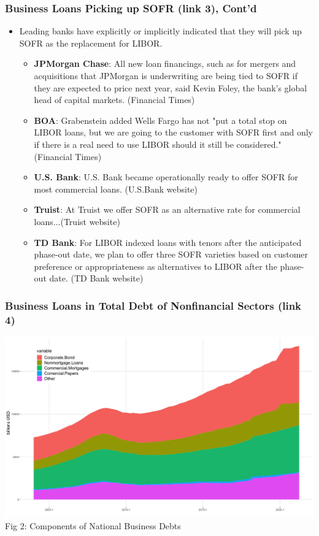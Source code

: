 \documentclass[10pt]{beamer}
\begin{document}
\begin{frame}
\frametitle{Business Loans Picking up SOFR (link 3),  Cont'd}
\begin{itemize}
\item Leading banks have explicitly or implicitly indicated that they will pick up SOFR as the replacement for LIBOR.
\begin{itemize}
\item \textbf{JPMorgan Chase}: All new loan financings, such as for mergers and acquisitions that JPMorgan is underwriting are being tied to SOFR if they are expected to price next year, said Kevin Foley, the bank's global head of capital markets. (Financial Times)
\item \textbf{BOA}: Grabenstein added Wells Fargo has not "put a total stop on LIBOR loans, but we are going to the customer with SOFR first and only if there is a real need to use LIBOR should it still be considered." (Financial Times)
\item \textbf{U.S.  Bank}: U.S. Bank became operationally ready to offer SOFR for most commercial loans.  (U.S.Bank website)
\item \textbf{Truist}: At Truist we offer SOFR as an alternative rate for commercial loans...(Truist website)
\item \textbf{TD Bank}: For LIBOR indexed loans with tenors after the anticipated phase-out date, we plan to offer three SOFR varieties based on customer preference or appropriateness as alternatives to LIBOR after the phase-out date.  (TD Bank website)
\end{itemize}
\end{itemize}
\end{frame}


\begin{frame}
\frametitle{\large Business Loans in Total Debt of Nonfinancial Sectors (link 4)}
\begin{center}
\includegraphics[scale=.22]{businessdebt.png}\\
\tiny Fig 2: Components of National Business Debts
\end{center}
\end{frame}
\end{document}
